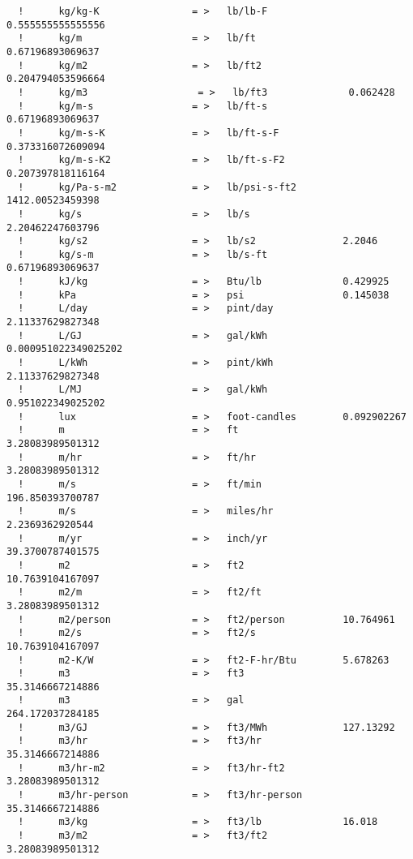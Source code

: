 \begin{lstlisting}
  !      kg/kg-K                = >   lb/lb-F             0.555555555555556
  !      kg/m                   = >   lb/ft               0.67196893069637
  !      kg/m2                  = >   lb/ft2              0.204794053596664
  !      kg/m3                   = >   lb/ft3              0.062428
  !      kg/m-s                 = >   lb/ft-s             0.67196893069637
  !      kg/m-s-K               = >   lb/ft-s-F           0.373316072609094
  !      kg/m-s-K2              = >   lb/ft-s-F2          0.207397818116164
  !      kg/Pa-s-m2             = >   lb/psi-s-ft2        1412.00523459398
  !      kg/s                   = >   lb/s                2.20462247603796
  !      kg/s2                  = >   lb/s2               2.2046
  !      kg/s-m                 = >   lb/s-ft             0.67196893069637
  !      kJ/kg                  = >   Btu/lb              0.429925
  !      kPa                    = >   psi                 0.145038
  !      L/day                  = >   pint/day            2.11337629827348
  !      L/GJ                   = >   gal/kWh             0.000951022349025202
  !      L/kWh                  = >   pint/kWh            2.11337629827348
  !      L/MJ                   = >   gal/kWh             0.951022349025202
  !      lux                    = >   foot-candles        0.092902267
  !      m                      = >   ft                  3.28083989501312
  !      m/hr                   = >   ft/hr               3.28083989501312
  !      m/s                    = >   ft/min              196.850393700787
  !      m/s                    = >   miles/hr            2.2369362920544
  !      m/yr                   = >   inch/yr             39.3700787401575
  !      m2                     = >   ft2                 10.7639104167097
  !      m2/m                   = >   ft2/ft              3.28083989501312
  !      m2/person              = >   ft2/person          10.764961
  !      m2/s                   = >   ft2/s               10.7639104167097
  !      m2-K/W                 = >   ft2-F-hr/Btu        5.678263
  !      m3                     = >   ft3                 35.3146667214886
  !      m3                     = >   gal                 264.172037284185
  !      m3/GJ                  = >   ft3/MWh             127.13292
  !      m3/hr                  = >   ft3/hr              35.3146667214886
  !      m3/hr-m2               = >   ft3/hr-ft2          3.28083989501312
  !      m3/hr-person           = >   ft3/hr-person       35.3146667214886
  !      m3/kg                  = >   ft3/lb              16.018
  !      m3/m2                  = >   ft3/ft2             3.28083989501312

\end{lstlisting}
